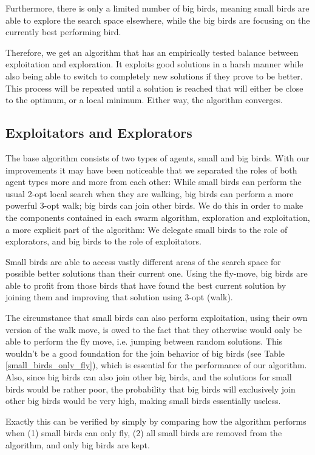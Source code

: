 Furthermore, there is only a limited number of big birds, meaning small birds are able
to explore the search space elsewhere, while the big birds are focusing on the currently best performing bird.

Therefore, we get an algorithm that has an empirically tested balance between exploitation and exploration.
It exploits good solutions in a harsh manner while also being able to switch to completely new solutions if they prove to be better.
This process will be repeated until a solution is reached that will either be close to the optimum, or a local minimum.
Either way, the algorithm converges.

\subsection{Exploitators and Explorators}
The base algorithm consists of two types of agents, small and big birds.
With our improvements it may have been noticeable that we separated the roles
of both agent types more and more from each other:
While small birds can perform the usual 2-opt local search when they are walking,
big birds can perform a more powerful 3-opt walk;
big birds can join other birds.
We do this in order to make the components contained in each swarm algorithm,
exploration and exploitation, a more explicit part of the algorithm:
We delegate small birds to the role of explorators, and big birds to the role of exploitators.

Small birds are able to access vastly different areas of the search space for possible better
solutions than their current one. Using the fly-move, big birds are able to profit
from those birds that have found the best current solution by joining them and
improving that solution using 3-opt (walk).


The circumstance that small birds can also perform exploitation, using their own version of the walk move,
is owed to the fact that they otherwise would only be able to perform
the fly move, i.e. jumping between random solutions.
This wouldn’t be a good foundation for the join behavior of big birds (see Table \ref{small_birds_only_fly}),
which is essential for the performance of our algorithm.
Also, since big birds can also join other big birds,
and the solutions for small birds would be rather poor, the probability that
big birds will exclusively join other big birds would be very high,
making small birds essentially useless.

Exactly this can be verified by simply by comparing how 
the algorithm performs when (1) small birds can only fly,
(2) all small birds are removed from the algorithm, and only big birds are kept.

